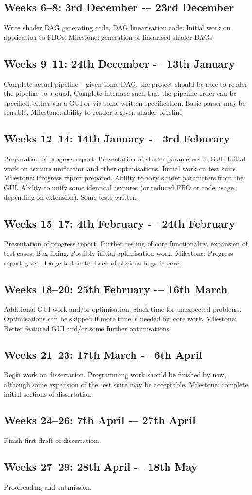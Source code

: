 \subsection{Weeks 6--8: 3rd December -– 23rd December}
Write shader DAG generating code, DAG linearisation code. Initial work on application to FBOs.
Milestone: generation of linearised shader DAGs
\subsection{Weeks 9--11: 24th December -– 13th January}
Complete actual pipeline – given some DAG, the project should be able to render the pipeline to a
quad. Complete interface such that the pipeline order can be specified, either via a GUI or via some
written specification. Basic parser may be sensible.
Milestone: ability to render a given shader pipeline
\subsection{Weeks 12--14: 14th January -– 3rd Feburary}
Preparation of progress report. Presentation of shader parameters in GUI. Initial
work on texture unification and other optimisations. Initial work on test suite.
Milestone: Progress report prepared. Ability to vary shader parameters from the GUI. Ability to
unify some identical textures (or reduced FBO or code usage, depending on extension). Some tests
written.
\subsection{Weeks 15--17: 4th February -– 24th February}
Presentation of progress report. Further testing of core functionality, expansion of test cases. Bug
fixing. Possibly initial
optimisation work.
Milestone: Progress report given. Large test suite. Lack of obvious bugs in core.
\subsection{Weeks 18--20: 25th February -– 16th March}
Additional GUI work and/or optimisation. Slack time for unexpected problems. Optimisations can
be skipped if more time is needed for core work.
Milestone: Better featured GUI and/or some further optimisations.
\subsection{Weeks 21--23: 17th March -– 6th April}
Begin work on dissertation. Programming work should be finished by now, although some
expansion of the test suite may be acceptable.
Milestone: complete initial sections of dissertation.
\subsection{Weeks 24--26: 7th April -– 27th April}
Finish first draft of dissertation.
\subsection{Weeks 27--29: 28th April -– 18th May}
Proofreading and submission.
